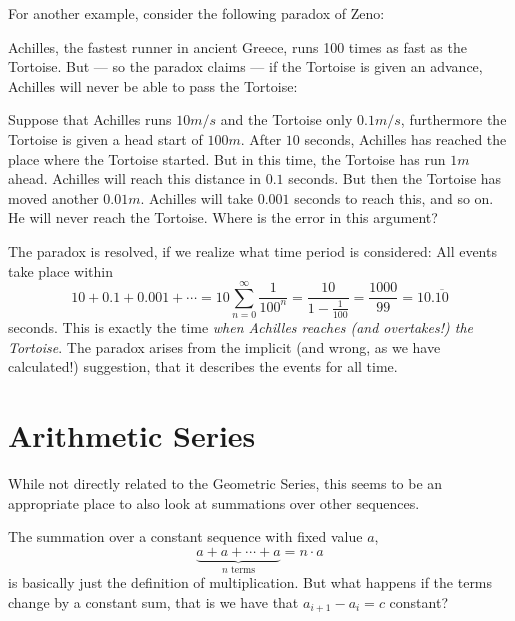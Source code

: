 For another example, consider the following paradox of Zeno:

Achilles, the fastest runner in ancient Greece, runs 100 times as
fast as the Tortoise. But --- so the paradox claims --- if the
Tortoise is given an advance, Achilles will never be able to pass
the Tortoise:

Suppose that Achilles runs
$10 m/s$ and the Tortoise only $0.1 m/s$, furthermore the Tortoise is given
a head start of $100m$.
After $10$ seconds, Achilles has reached the place where the Tortoise
started. But in this time, the Tortoise has run $1m$ ahead. Achilles will
reach this distance in $0.1$ seconds. But then the Tortoise has moved
another $0.01m$. Achilles will take $0.001$ seconds to reach this, and so
on. He will never reach the Tortoise. Where is the error in this argument?

The paradox is resolved, if we realize what time period is considered:
All events take place within
\[
10+0.1+0.001+\cdots=10\sum_{n=0}^\infty
\frac{1}{100^n}=\frac{10}{1-\frac{1}{100}}=\frac{1000}{99}=10.\overline{10}
\]
seconds. This is exactly the time {\em when Achilles reaches (and
overtakes!) the Tortoise}. The paradox arises from the implicit
(and wrong, as we have calculated!)
suggestion, that it describes the events for all time.

\section{Arithmetic Series}

While not directly related to the Geometric Series, this seems to be an
appropriate place to also look at summations over other sequences.

The summation over a constant sequence with fixed value $a$,
\[
\underbrace{a+a+\cdots +a}_{\mbox{$n$ terms}}=n\cdot a
\]
is basically just the definition of multiplication. But what happens if the
terms change by a constant sum, that is we have that $a_{i+1}-a_i=c$
constant?

